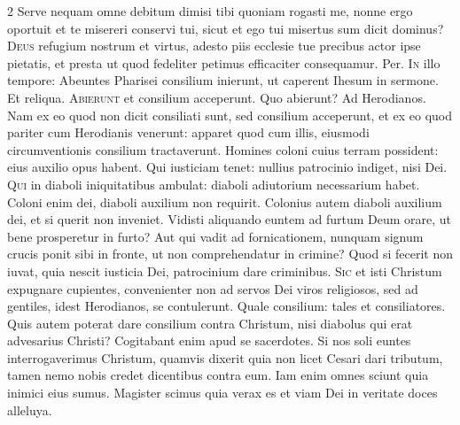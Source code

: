 \begin{multicols*}{2}
 Serve nequam omne debitum dimisi tibi quoniam rogasti me, nonne ergo oportuit et te misereri conservi tui, sicut et ego tui misertus sum dicit dominus?
\lettrine[lines=2]{\zallmancaps \color{Red} D}{eus} refugium nostrum et virtus, adesto piis ecclesie tue precibus actor ipse pietatis, et presta ut quod fedeliter petimus efficaciter consequamur. Per.
\lettrine[lines=2]{\zallmancaps \color{Blue} I}{n} illo tempore: Abeuntes Pharisei consilium inierunt, ut caperent Ihesum in sermone. Et reliqua.
 \grecross
\lettrine[lines=2]{\zallmancaps \color{Red} A}{bierunt} et consilium acceperunt. Quo abierunt? Ad Herodianos. Nam ex eo quod non dicit consiliati sunt, sed consilium acceperunt, et ex eo quod pariter cum Herodianis venerunt: apparet quod cum illis, eiusmodi circumventionis consilium tractaverunt. Homines coloni cuius terram possident: eius auxilio opus habent. Qui iusticiam tenet: nullius patrocinio indiget, nisi Dei.
\lettrine[lines=2]{\zallmancaps \color{Blue} Q}{ui} in diaboli iniquitatibus ambulat: diaboli adiutorium necessarium habet. Coloni enim dei, diaboli auxilium non requirit. Colonius autem diaboli auxilium dei, et si querit non inveniet. Vidisti aliquando euntem ad furtum Deum orare, ut bene prosperetur in furto? Aut qui vadit ad fornicationem, nunquam signum crucis ponit sibi in fronte, ut non comprehendatur in crimine? Quod si fecerit non iuvat, quia nescit iusticia Dei, patrocinium dare criminibus.
\lettrine[lines=2]{\zallmancaps \color{Red} S}{ic} et isti Christum expugnare cupientes, convenienter non ad servos Dei viros religiosos, sed ad gentiles, idest Herodianos, se contulerunt. Quale consilium: tales et consiliatores. Quis autem poterat dare consilium contra Christum, nisi diabolus qui erat advesarius Christi? Cogitabant enim apud se sacerdotes. Si nos soli euntes interrogaverimus Christum, quamvis dixerit quia non licet Cesari dari tributum, tamen nemo nobis credet dicentibus contra eum. Iam enim omnes sciunt quia inimici eius sumus.
 Magister scimus quia verax es et viam Dei in veritate doces alleluya.

\end{multicols*}
